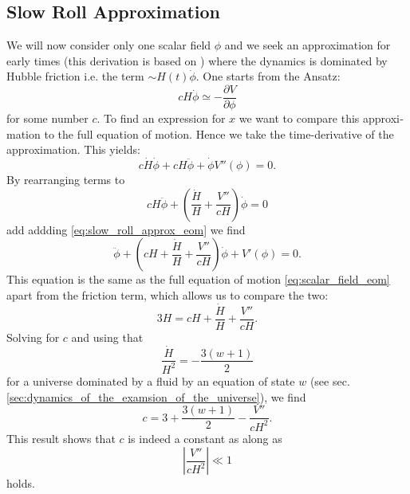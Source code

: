\documentclass[master,       %
               twoside,        %
               BCOR10mm,       %
               english,ngerman, %
               ]{GAUBM}
\begin{document}
\begin{otherlanguage}{english}
\subsection{Slow Roll Approximation}
\label{sec:slow_roll_approximation}
We will now consider only one scalar field $\phi$ and we seek an approximation for early times (this derivation is based on \cite[appendix A]{early_scalar_field_dynamics_PhysRevD.84.123506}) where the dynamics is dominated by Hubble friction i.e. the term $\sim H(t) \dot{\phi}$.
One starts from the Ansatz:
\begin{equation}
	\label{eq:slow_roll_approx_eom}
	c H \dot{\phi} \simeq - \frac{\partial V}{\partial \phi}
\end{equation}
for some number $c$.
To find an expression for $x$ we want to compare this approximation to the full equation of motion. Hence we take the time-derivative of the approximation. This yields:
\begin{equation}
	c \dot{H} \dot{\phi} + c H \ddot{\phi} + \dot{\phi} V''(\phi) = 0.
\end{equation}
By rearranging terms to
\begin{equation}
	c H \ddot{\phi} + \left(\frac{\dot{H}}{H} + \frac{V''}{c H}\right) \dot{\phi} = 0
\end{equation}
add addding \eqref{eq:slow_roll_approx_eom} we find
\begin{equation}
	\ddot{\phi} + \left( cH + \frac{\dot{H}}{H} + \frac{V''}{c H} \right) \dot{\phi} + V'(\phi) = 0.
\end{equation}
This equation is the same as the full equation of motion \eqref{eq:scalar_field_eom} apart from the friction term,
which allows us to compare the two:
\begin{equation}
	3 H = c H + \frac{\dot{H}}{H} + \frac{V''}{c H}.
\end{equation}
Solving for $c$ and using that
\begin{equation}
	\frac{\dot{H}}{H^2} = - \frac{3(w + 1)}{2}
\end{equation}
for a universe dominated by a fluid by an equation of state $w$ (see sec. \ref{sec:dynamics_of_the_examsion_of_the_universe}), we find 
\begin{equation}
	c = 3 +\frac{3(w + 1)}{2} - \frac{V''}{c H^2}.
\end{equation}
This result shows that $c$ is indeed a constant as along as 
\begin{equation}
	\label{eq:slow_roll_condition}
	\left| \frac{V''}{c H^2} \right| \ll 1
\end{equation}
holds.


\end{otherlanguage}
\end{document}

